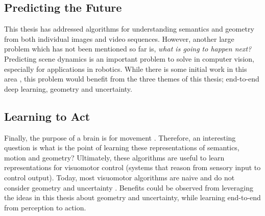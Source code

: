 \subsection{Predicting the Future}
This thesis has addressed algorithms for understanding semantics and geometry from both individual images and video sequences. However, another large problem which has not been mentioned so far is, \textit{what is going to happen next?} Predicting scene dynamics is an important problem to solve in computer vision, especially for applications in robotics. While there is some initial work in this area \citep{luc2017predicting}, this problem would benefit from the three themes of this thesis; end-to-end deep learning, geometry and uncertainty.

\subsection{Learning to Act}
Finally, the purpose of a brain is for movement \citep{wolpert2000computational}. Therefore, an interesting question is what is the point of learning these representations of semantics, motion and geometry? Ultimately, these algorithms are useful to learn representations for visuomotor control (systems that reason from sensory input to control output). Today, most visuomotor algorithms are naive and do not consider geometry and uncertainty \citep{levine2016end,kendall2018learning}. Benefits could be observed from leveraging the ideas in this thesis about geometry and uncertainty, while learning end-to-end from perception to action.

